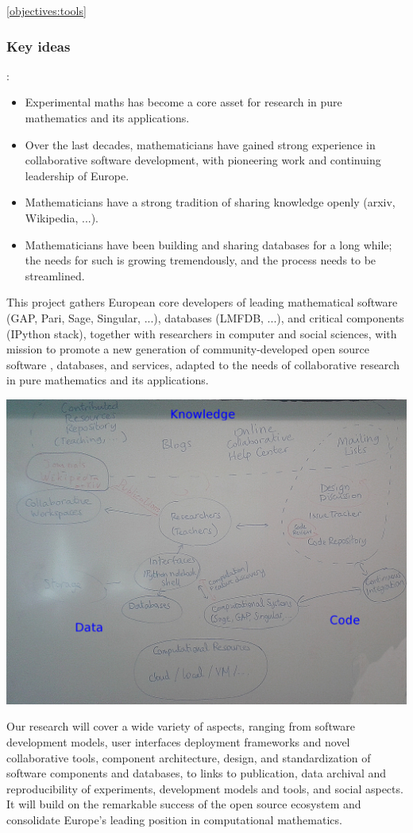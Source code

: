 \documentclass[a4paper,11pt]{article}
\begin{document}
\ref{objectives:tools}


\subsubsection{Key ideas}:
\begin{itemize}
\item Experimental maths has become a core asset for research in pure
  mathematics and its applications.
\item Over the last decades, mathematicians have gained strong
  experience in collaborative software development, with pioneering
  work and continuing leadership of Europe.
\item Mathematicians have a strong tradition of sharing knowledge
  openly (arxiv, Wikipedia, ...).
\item Mathematicians have been building and sharing databases for a
  long while; the needs for such is growing tremendously, and the
  process needs to be streamlined.
\end{itemize}


This project gathers European core developers of leading mathematical
software (GAP, Pari, Sage, Singular, ...), databases (LMFDB, ...), and
critical components (IPython stack), together with researchers in
computer and social sciences, with mission to promote a new generation
of community-developed open source software , databases, and services,
adapted to the needs of collaborative research in pure mathematics and
its applications.


\includegraphics[width=.6\textwidth]{Pictures/TheBigPicture.jpg}

Our research will cover a wide variety of aspects, ranging from
software development models, user interfaces   deployment frameworks and novel collaborative tools,
component architecture, design, and standardization of software
components and databases, to links to publication, data archival and
reproducibility of experiments, development models and tools, and
social aspects. It will build on the remarkable success of the open
source ecosystem and consolidate Europe's leading position in
computational mathematics.
\end{document}
